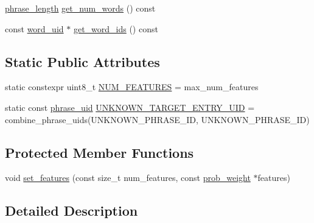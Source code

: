 \begin{DoxyCompactItemize}
\item 
\hyperlink{namespaceuva_1_1smt_1_1bpbd_1_1server_af068a19c2e03116caf3e3827a3e40e35}{phrase\+\_\+length} \hyperlink{classuva_1_1smt_1_1bpbd_1_1server_1_1tm_1_1models_1_1tm__target__entry__temp_ad2a6ad83bb757e9eb4f229cd8fbbf3c1}{get\+\_\+num\+\_\+words} () const 
\item 
const \hyperlink{namespaceuva_1_1smt_1_1bpbd_1_1server_a6bfe45ba344d65a7fdd7d26156328ddc}{word\+\_\+uid} $\ast$ \hyperlink{classuva_1_1smt_1_1bpbd_1_1server_1_1tm_1_1models_1_1tm__target__entry__temp_adc2c72a44fecd698961cf8f2fcc4bb2e}{get\+\_\+word\+\_\+ids} () const 
\end{DoxyCompactItemize}
\subsection*{Static Public Attributes}
\begin{DoxyCompactItemize}
\item 
static constexpr uint8\+\_\+t \hyperlink{classuva_1_1smt_1_1bpbd_1_1server_1_1tm_1_1models_1_1tm__target__entry__temp_a573774a3d8a5e4c1c0a0ba1c00b5e7c7}{N\+U\+M\+\_\+\+F\+E\+A\+T\+U\+R\+E\+S} = max\+\_\+num\+\_\+features
\item 
static const \hyperlink{namespaceuva_1_1smt_1_1bpbd_1_1server_ad18d4cdf5504e76c22b0c124ff60b44f}{phrase\+\_\+uid} \hyperlink{classuva_1_1smt_1_1bpbd_1_1server_1_1tm_1_1models_1_1tm__target__entry__temp_adc270949b1ccda2bd58fa6950fa5ae6e}{U\+N\+K\+N\+O\+W\+N\+\_\+\+T\+A\+R\+G\+E\+T\+\_\+\+E\+N\+T\+R\+Y\+\_\+\+U\+I\+D} = combine\+\_\+phrase\+\_\+uids(U\+N\+K\+N\+O\+W\+N\+\_\+\+P\+H\+R\+A\+S\+E\+\_\+\+I\+D, U\+N\+K\+N\+O\+W\+N\+\_\+\+P\+H\+R\+A\+S\+E\+\_\+\+I\+D)
\end{DoxyCompactItemize}
\subsection*{Protected Member Functions}
\begin{DoxyCompactItemize}
\item 
void \hyperlink{classuva_1_1smt_1_1bpbd_1_1server_1_1tm_1_1models_1_1tm__target__entry__temp_a71842af251358e437e4d1f8c98b62528}{set\+\_\+features} (const size\+\_\+t num\+\_\+features, const \hyperlink{namespaceuva_1_1smt_1_1bpbd_1_1server_a01e9ea4de9c226f4464862e84ff0bbcc}{prob\+\_\+weight} $\ast$features)
\end{DoxyCompactItemize}


\subsection{Detailed Description}
